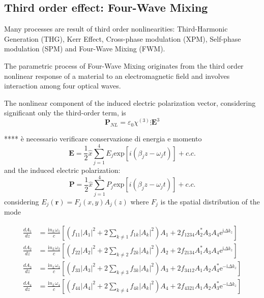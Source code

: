 \documentclass[12pt,a4paper,twoside]{article}
\begin{document}
\subsection{Third order effect: Four-Wave Mixing}
Many processes are result of third order nonlinearities: Third-Harmonic Generation (THG), Kerr Effect, Cross-phase modulation (XPM), Self-phase modulation (SPM) and Four-Wave Mixing (FWM).

The parametric process of Four-Wave Mixing originates from the third order nonlinear response of a material to an electromagnetic field and involves interaction among four optical waves.

The nonlinear component of the induced electric polarization vector, considering significant only the third-order term, is
$$ \textbf{P}_{NL} = \varepsilon_0 \chi^{(3)} \vdots \textbf{E}^3 $$


\vspace{18pt}
****		è necessario verificare conservazione di energia e momento
\vspace{12pt}
\begin{equation}
	\textbf{E} = \frac{1}{2}\hat{x} \sum_{j=1}^4 E_j \mathrm{exp}[i(\beta_j z - \omega_j t)] + c.c.
	\label{eq_E}
\end{equation}
and the induced electric polarization:
\begin{equation}
	\textbf{P} = \frac{1}{2}\hat{x} \sum_{j=1}^4 P_j \mathrm{exp}[i(\beta_j z - \omega_j t)] + c.c.
	\label{eq_P}
\end{equation}
considering $E_j(\textbf{r}) = F_j(x,y)A_j(z)$ where $F_j$ is the spatial distribution of the mode

\begin{subequations}
\begin{align}
	\frac{dA_1}{dz} &= \frac{\mathrm{i}n_L\omega_1}{c}\left[ \left( f_{11} |A_1|^2 + 2 \sum_{k\neq1} f_{1k}|A_k|^2\right)A_1 + 2f_{1234}A_2^*A_3A_4\mathrm{e}^{\mathrm{i}\Delta k_z} \right] \\
	\frac{dA_2}{dz} &= \frac{\mathrm{i}n_L\omega_2}{c}\left[ \left( f_{22} |A_2|^2 + 2 \sum_{k\neq2} f_{2k}|A_k|^2\right)A_2 + 2f_{2134}A_1^*A_3A_4\mathrm{e}^{\mathrm{i}\Delta k_z} \right] \\
	\frac{dA_3}{dz} &= \frac{\mathrm{i}n_L\omega_3}{c}\left[ \left( f_{33} |A_3|^2 + 2 \sum_{k\neq3} f_{3k}|A_k|^2\right)A_3 + 2f_{3412}A_1A_2A_4^*\mathrm{e}^{-\mathrm{i}\Delta k_z} \right] \\
	\frac{dA_4}{dz} &= \frac{\mathrm{i}n_L\omega_4}{c}\left[ \left( f_{44} |A_4|^2 + 2 \sum_{k\neq4} f_{4k}|A_k|^2\right)A_4 + 2f_{4321}A_1A_2A_3^*\mathrm{e}^{-\mathrm{i}\Delta k_z} \right]
\end{align}
\label{eq_coupled_amplitude}
\end{subequations}
\end{document}
